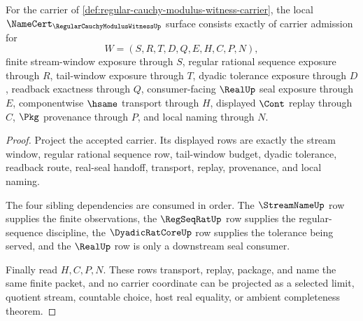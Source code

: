 \begin{theorem}
\label{thm:regular-cauchy-modulus-witness-namecert-obligations}
For the carrier of \autoref{def:regular-cauchy-modulus-witness-carrier}, the local $\NameCert_{\RegularCauchyModulusWitnessUp}$ surface consists exactly of carrier admission for
$$
W=(S,R,T,D,Q,E,H,C,P,N),
$$
finite stream-window exposure through $S$, regular rational sequence exposure through $R$, tail-window exposure through $T$, dyadic tolerance exposure through $D$, readback exactness through $Q$, consumer-facing $\RealUp$ seal exposure through $E$, componentwise $\hsame$ transport through $H$, displayed $\Cont$ replay through $C$, $\Pkg$ provenance through $P$, and local naming through $N$.
\end{theorem}
\begin{proof}
Project the accepted carrier. Its displayed rows are exactly the stream window, regular rational sequence row, tail-window budget, dyadic tolerance, readback route, real-seal handoff, transport, replay, provenance, and local naming.

The four sibling dependencies are consumed in order. The $\StreamNameUp$ row supplies the finite observations, the $\RegSeqRatUp$ row supplies the regular-sequence discipline, the $\DyadicRatCoreUp$ row supplies the tolerance being served, and the $\RealUp$ row is only a downstream seal consumer.

Finally read $H,C,P,N$. These rows transport, replay, package, and name the same finite packet, and no carrier coordinate can be projected as a selected limit, quotient stream, countable choice, host real equality, or ambient completeness theorem.
\end{proof}

\begin{closurestatus}{\RegularCauchyModulusWitnessUp}
  \theoryclosure{\obligationClosure}
  \formalstatus{\unformalizedV}
\end{closurestatus}
